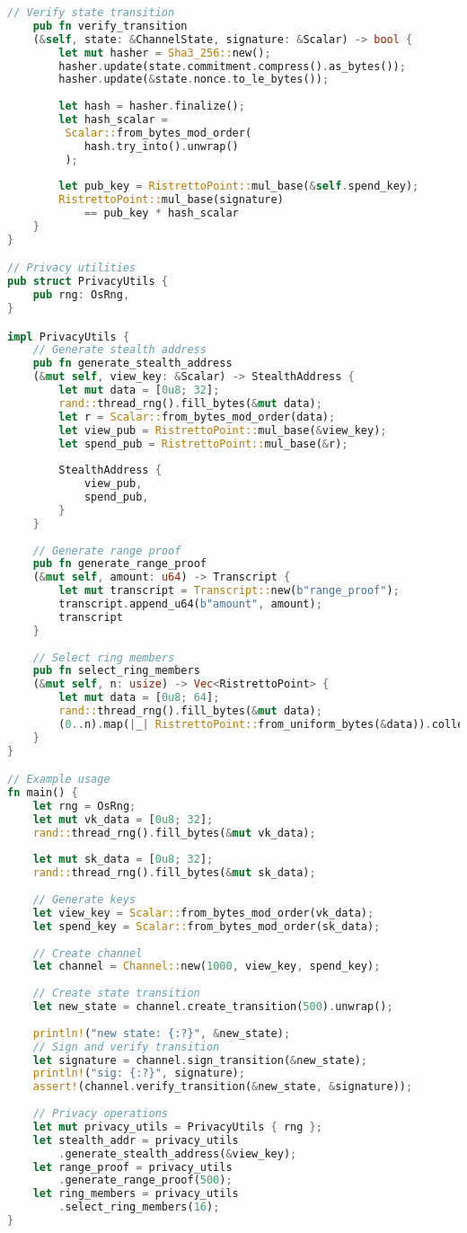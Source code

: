 \documentclass[11pt]{amsart}
\begin{document}
\begin{lstlisting}[language=Rust]
	// Verify state transition
	pub fn verify_transition
	(&self, state: &ChannelState, signature: &Scalar) -> bool {
		let mut hasher = Sha3_256::new();
		hasher.update(state.commitment.compress().as_bytes());
		hasher.update(&state.nonce.to_le_bytes());
		
		let hash = hasher.finalize();
		let hash_scalar =
		 Scalar::from_bytes_mod_order(
		 	hash.try_into().unwrap()
		 );
		
		let pub_key = RistrettoPoint::mul_base(&self.spend_key);
		RistrettoPoint::mul_base(signature) 
			== pub_key * hash_scalar
	}
}

// Privacy utilities
pub struct PrivacyUtils {
	pub rng: OsRng,
}

impl PrivacyUtils {
	// Generate stealth address
	pub fn generate_stealth_address
	(&mut self, view_key: &Scalar) -> StealthAddress {
		let mut data = [0u8; 32];
		rand::thread_rng().fill_bytes(&mut data);
		let r = Scalar::from_bytes_mod_order(data);
		let view_pub = RistrettoPoint::mul_base(&view_key);
		let spend_pub = RistrettoPoint::mul_base(&r);
		
		StealthAddress {
			view_pub,
			spend_pub,
		}
	}
	
	// Generate range proof
	pub fn generate_range_proof
	(&mut self, amount: u64) -> Transcript {
		let mut transcript = Transcript::new(b"range_proof");
		transcript.append_u64(b"amount", amount);
		transcript
	}
	
	// Select ring members
	pub fn select_ring_members
	(&mut self, n: usize) -> Vec<RistrettoPoint> {
		let mut data = [0u8; 64];
		rand::thread_rng().fill_bytes(&mut data);
		(0..n).map(|_| RistrettoPoint::from_uniform_bytes(&data)).collect()
	}
}

// Example usage
fn main() {
	let rng = OsRng; 
	let mut vk_data = [0u8; 32];
	rand::thread_rng().fill_bytes(&mut vk_data);
	
	let mut sk_data = [0u8; 32];
	rand::thread_rng().fill_bytes(&mut sk_data);
	
	// Generate keys
	let view_key = Scalar::from_bytes_mod_order(vk_data);
	let spend_key = Scalar::from_bytes_mod_order(sk_data);
	
	// Create channel
	let channel = Channel::new(1000, view_key, spend_key);
	
	// Create state transition
	let new_state = channel.create_transition(500).unwrap();
	
	println!("new state: {:?}", &new_state);
	// Sign and verify transition
	let signature = channel.sign_transition(&new_state);
	println!("sig: {:?}", signature);
	assert!(channel.verify_transition(&new_state, &signature));
	
	// Privacy operations
	let mut privacy_utils = PrivacyUtils { rng };
	let stealth_addr = privacy_utils
		.generate_stealth_address(&view_key);
	let range_proof = privacy_utils
		.generate_range_proof(500);
	let ring_members = privacy_utils
		.select_ring_members(16);
}
\end{lstlisting}
\end{document}
